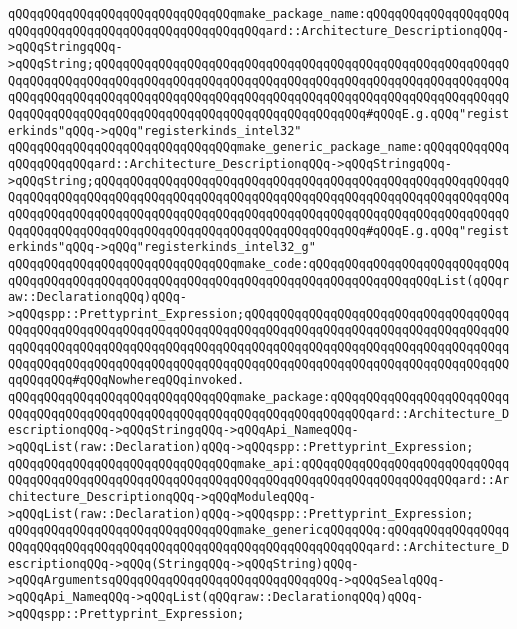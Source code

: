 \verb|qQQqqQQqqQQqqQQqqQQqqQQqqQQqqQQqmake_package_name:qQQqqQQqqQQqqQQqqQQqqQQqqQQqqQQqqQQqqQQqqQQqqQQqqQQqqQQqard::Architecture_DescriptionqQQq->qQQqStringqQQq->qQQqString;qQQqqQQqqQQqqQQqqQQqqQQqqQQqqQQqqQQqqQQqqQQqqQQqqQQqqQQqqQQqqQQqqQQqqQQqqQQqqQQqqQQqqQQqqQQqqQQqqQQqqQQqqQQqqQQqqQQqqQQqqQQqqQQqqQQqqQQqqQQqqQQqqQQqqQQqqQQqqQQqqQQqqQQqqQQqqQQqqQQqqQQqqQQqqQQqqQQqqQQqqQQqqQQqqQQqqQQqqQQqqQQqqQQqqQQqqQQqqQQqqQQqqQQq#qQQqE.g.qQQq"registerkinds"qQQq->qQQq"registerkinds_intel32"|\newline
\verb|qQQqqQQqqQQqqQQqqQQqqQQqqQQqqQQqmake_generic_package_name:qQQqqQQqqQQqqQQqqQQqqQQqard::Architecture_DescriptionqQQq->qQQqStringqQQq->qQQqString;qQQqqQQqqQQqqQQqqQQqqQQqqQQqqQQqqQQqqQQqqQQqqQQqqQQqqQQqqQQqqQQqqQQqqQQqqQQqqQQqqQQqqQQqqQQqqQQqqQQqqQQqqQQqqQQqqQQqqQQqqQQqqQQqqQQqqQQqqQQqqQQqqQQqqQQqqQQqqQQqqQQqqQQqqQQqqQQqqQQqqQQqqQQqqQQqqQQqqQQqqQQqqQQqqQQqqQQqqQQqqQQqqQQqqQQqqQQqqQQqqQQqqQQq#qQQqE.g.qQQq"registerkinds"qQQq->qQQq"registerkinds_intel32_g"|\newline
\newline
\verb|qQQqqQQqqQQqqQQqqQQqqQQqqQQqqQQqmake_code:qQQqqQQqqQQqqQQqqQQqqQQqqQQqqQQqqQQqqQQqqQQqqQQqqQQqqQQqqQQqqQQqqQQqqQQqqQQqqQQqqQQqqQQqList(qQQqraw::DeclarationqQQq)qQQq->qQQqspp::Prettyprint_Expression;qQQqqQQqqQQqqQQqqQQqqQQqqQQqqQQqqQQqqQQqqQQqqQQqqQQqqQQqqQQqqQQqqQQqqQQqqQQqqQQqqQQqqQQqqQQqqQQqqQQqqQQqqQQqqQQqqQQqqQQqqQQqqQQqqQQqqQQqqQQqqQQqqQQqqQQqqQQqqQQqqQQqqQQqqQQqqQQqqQQqqQQqqQQqqQQqqQQqqQQqqQQqqQQqqQQqqQQqqQQqqQQqqQQqqQQqqQQqqQQqqQQqqQQqqQQqqQQq#qQQqNowhereqQQqinvoked.|\newline
\verb|qQQqqQQqqQQqqQQqqQQqqQQqqQQqqQQqmake_package:qQQqqQQqqQQqqQQqqQQqqQQqqQQqqQQqqQQqqQQqqQQqqQQqqQQqqQQqqQQqqQQqqQQqqQQqqQQqard::Architecture_DescriptionqQQq->qQQqStringqQQq->qQQqApi_NameqQQq->qQQqList(raw::Declaration)qQQq->qQQqspp::Prettyprint_Expression;|\newline
\verb|qQQqqQQqqQQqqQQqqQQqqQQqqQQqqQQqmake_api:qQQqqQQqqQQqqQQqqQQqqQQqqQQqqQQqqQQqqQQqqQQqqQQqqQQqqQQqqQQqqQQqqQQqqQQqqQQqqQQqqQQqqQQqqQQqard::Architecture_DescriptionqQQq->qQQqModuleqQQq->qQQqList(raw::Declaration)qQQq->qQQqspp::Prettyprint_Expression;|\newline
\newline
\verb|qQQqqQQqqQQqqQQqqQQqqQQqqQQqqQQqmake_genericqQQqqQQq:qQQqqQQqqQQqqQQqqQQqqQQqqQQqqQQqqQQqqQQqqQQqqQQqqQQqqQQqqQQqqQQqqQQqard::Architecture_DescriptionqQQq->qQQq(StringqQQq->qQQqString)qQQq->qQQqArgumentsqQQqqQQqqQQqqQQqqQQqqQQqqQQqqQQq->qQQqSealqQQq->qQQqApi_NameqQQq->qQQqList(qQQqraw::DeclarationqQQq)qQQq->qQQqspp::Prettyprint_Expression;|\newline
